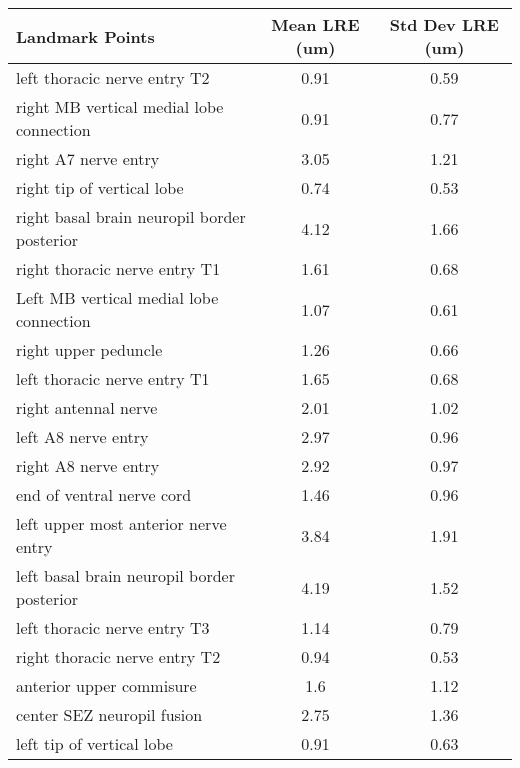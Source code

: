 \begin{tabular}{lcc}
\hline
 ﻿Landmark Points                            & Mean LRE (um) & Std Dev LRE (um) \\ \hline \hline
 left thoracic nerve entry T2                & 0.91          & 0.59             \\
 right MB vertical medial lobe connection    & 0.91          & 0.77             \\
 right A7 nerve entry                        & 3.05          & 1.21             \\
 right tip of vertical lobe                  & 0.74          & 0.53             \\
 right basal brain neuropil border posterior & 4.12          & 1.66             \\
 right thoracic nerve entry T1               & 1.61          & 0.68             \\
 Left MB vertical medial lobe connection     & 1.07          & 0.61             \\
 right upper peduncle                        & 1.26          & 0.66             \\
 left thoracic nerve entry T1                & 1.65          & 0.68             \\
 right antennal nerve                        & 2.01          & 1.02             \\
 left A8 nerve entry                         & 2.97          & 0.96             \\
 right A8 nerve entry                        & 2.92          & 0.97             \\
 end of ventral nerve cord                   & 1.46          & 0.96             \\
 left upper most anterior nerve entry        & 3.84          & 1.91             \\
 left basal brain neuropil border posterior  & 4.19          & 1.52             \\
 left thoracic nerve entry T3                & 1.14          & 0.79             \\
 right thoracic nerve entry T2               & 0.94          & 0.53             \\
 anterior upper commisure                    & 1.6           & 1.12             \\
 center SEZ neuropil fusion                  & 2.75          & 1.36             \\
 left tip of vertical lobe                   & 0.91          & 0.63             \\

\end{tabular}
